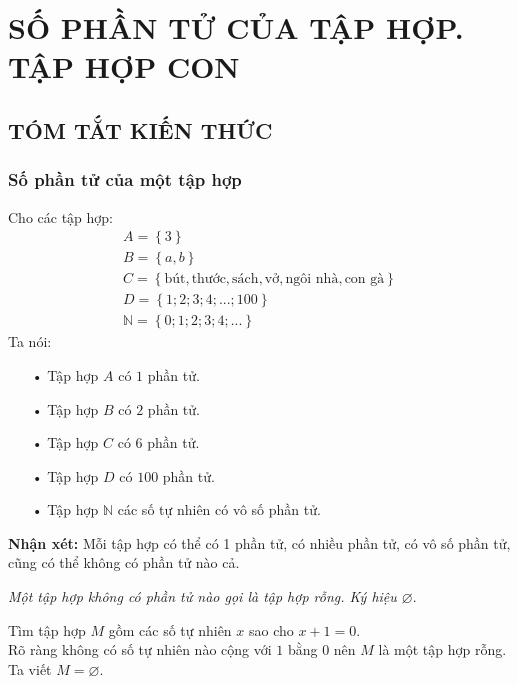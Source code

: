 \section{SỐ PHẦN TỬ CỦA TẬP HỢP. TẬP HỢP CON}
\subsection{TÓM TẮT KIẾN THỨC}
\begin{tomtat}
	\subsubsection{Số phần tử của một tập hợp}
Cho các tập hợp:
\[\begin{array}{l}
A = \left\{ 3 \right\}\\
B = \left\{ {a,b} \right\}\\
C = \left\{\text{bút}, \text{thước}, \text{sách}, \text{vở}, \text{ngôi nhà}, \text{con gà} \right\}\\
D = \left\{ {1;2;3;4;...;100} \right\}\\
\mathbb{N} = \left\{ {0;1;2;3;4;...} \right\}
\end{array}\]
Ta nói:
\begin{itemize}
\item[•] Tập hợp $A$ có $1$ phần tử.
\item[•] Tập hợp $B$ có $2$ phần tử.
\item[•] Tập hợp $C$ có $6$ phần tử.
\item[•] Tập hợp $D$ có $100$ phần tử.
\item[•] Tập hợp $\mathbb{N}$ các số tự nhiên có vô số phần tử.
\end{itemize} 
\textbf{Nhận xét:} Mỗi tập hợp có thể có 1 phần tử, có nhiều phần tử, có vô số phần tử, cũng có thể không có phần tử nào cả.
\begin{note}
	 \textit{Một tập hợp không có phần tử nào gọi là tập hợp rỗng. Ký hiệu $\varnothing$}.
\end{note}

\begin{vd}
	Tìm tập hợp $M$ gồm các số tự nhiên $x$ sao cho $x + 1 =0$.\\   
Rõ ràng không có số tự nhiên nào cộng với $1$ bằng 0 nên $M$ là một tập hợp rỗng. Ta viết $M = \varnothing$.
\end{vd}

\end{tomtat}
